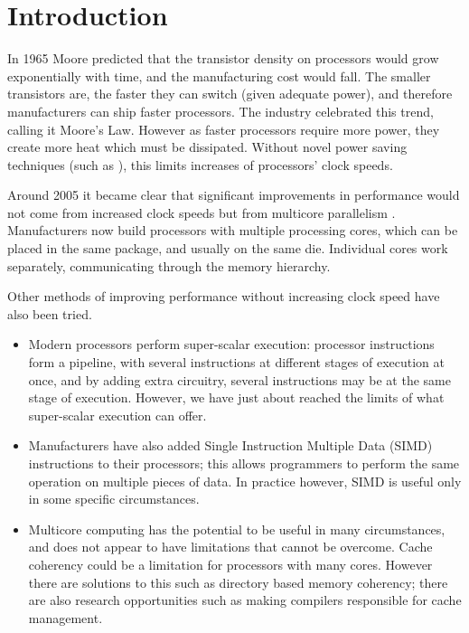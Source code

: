 %
%
\chapter{Introduction}
\label{chap:intro}


In 1965 Moore \citep{moore} predicted that the transistor 
density on processors would grow exponentially with time,
and the manufacturing cost would fall.
The smaller transistors are, the faster they can switch
(given adequate power),
and therefore manufacturers can ship faster processors.
The industry celebrated this trend,
calling it Moore's Law.
However as faster processors require more power,
they create more heat which must be dissipated.
Without novel power saving techniques
(such as \citet{intel-high-k}),
this limits increases of processors' clock speeds.

Around 2005 it became clear that significant improvements in performance
would not come from increased clock speeds but from multicore parallelism
\citep{free_lunch}.
Manufacturers now build processors with multiple processing cores,
which can be placed in the same package,
and usually on the same die.
Individual cores work separately, communicating through the memory
hierarchy.

Other methods of improving performance without increasing clock speed have
also been tried.

\begin{itemize}

\item
Modern processors perform super-scalar execution:
processor instructions form a pipeline,
with several instructions at different stages of execution at once,
and by adding extra circuitry, several instructions may be at the same stage
of execution.
However, we have just about reached the limits of what super-scalar
execution can offer.

\item
Manufacturers have also added Single Instruction Multiple Data (SIMD)
instructions to their processors;
this allows programmers to perform the same operation on multiple pieces of
data.
In practice however, SIMD is useful only in some specific circumstances.

\item
Multicore computing has the potential to be useful in many circumstances,
and does not appear to have limitations that cannot be overcome.
Cache coherency could be a limitation for processors with many cores.
However there are solutions to this such as directory based memory
coherency;
there are also research opportunities such as making compilers responsible
for cache management.

\end{itemize}

